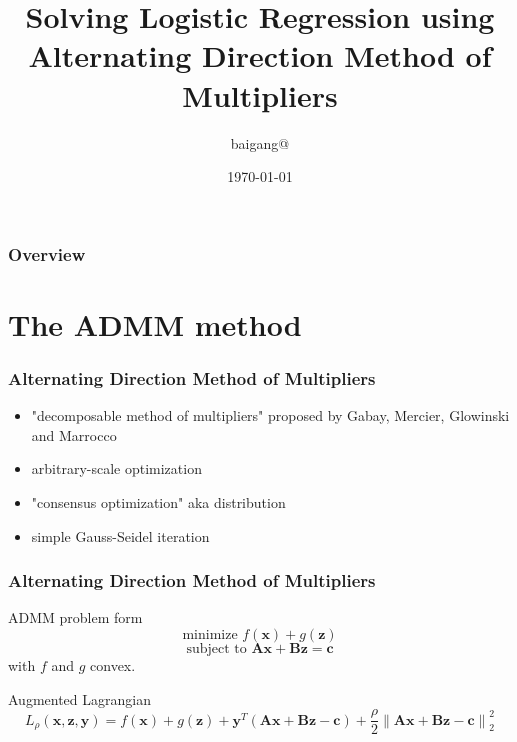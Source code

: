 \documentclass{beamer}
\title[LR ADMM]{Solving Logistic Regression using \\ Alternating Direction Method of Multipliers}
\author{
baigang@
} %
\institute[SAA] %
{
\textit{Sina Ad Algo}
}
\date{\today} %
\begin{document}
\begin{frame}
\titlepage %
\end{frame}

\begin{frame}
\frametitle{Overview} %
\tableofcontents %
\end{frame}


\section{The ADMM method} 

\begin{frame}
\frametitle{Alternating Direction Method of Multipliers}
\begin{itemize}
\item "decomposable method of multipliers" proposed by Gabay, Mercier, Glowinski and Marrocco
\item arbitrary-scale optimization
\item "consensus optimization" aka distribution
\item simple Gauss-Seidel iteration
\end{itemize}
\end{frame}

\begin{frame}
\frametitle{Alternating Direction Method of Multipliers}
\begin{block}{ADMM problem form}
$$\text{minimize } f(\mathbf{x}) + g(\mathbf{z})$$
$$\text{subject to } \mathbf{Ax} + \mathbf{Bz} = \mathbf{c}$$
with $f$ and $g$ convex.
\end{block}
\begin{block}{Augmented Lagrangian}
$$L_\rho(\mathbf{x},\mathbf{z},\mathbf{y}) = f(\mathbf{x}) + g(\mathbf{z}) + \mathbf{y}^T(\mathbf{Ax}+\mathbf{Bz}-\mathbf{c}) + \frac{\rho}{2} {\|\mathbf{Ax}+\mathbf{Bz}-\mathbf{c}\|}_2^2$$
\end{block}
\end{frame}
\end{document}
